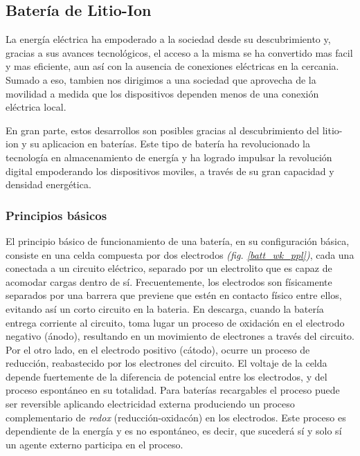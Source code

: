 \documentclass[10pt,a4paper]{article}
\begin{document}
\subsection{Batería de Litio-Ion}

La energía eléctrica ha empoderado a la sociedad desde su descubrimiento y,
gracias a sus avances tecnológicos, el acceso a la misma se ha convertido mas
facil y mas eficiente, aun así con la ausencia de conexiones eléctricas en la
cercania. Sumado a eso, tambien nos dirigimos a una sociedad que aprovecha de la
movilidad a medida que los dispositivos dependen menos de una conexi\'on 
el\'ectrica local.

\noindent En gran parte, estos desarrollos son posibles gracias al
descubrimiento del litio-ion y su aplicacion en baterías. Este tipo de batería
ha revolucionado la tecnolog\'ia en almacenamiento de energ\'ia y ha logrado
impulsar la revoluci\'on digital empoderando los dispositivos moviles, 
a trav\'es de su gran capacidad y densidad energ\'etica.

\subsubsection{Principios b\'asicos}

El principio básico de funcionamiento de una batería, en su configuraci\'on
b\'asica, consiste en una celda compuesta por dos electrodos 
\emph{(fig. \ref{batt_wk_ppl})}, cada una conectada a un circuito el\'ectrico, 
separado por un electrolito que es capaz de acomodar cargas dentro de sí. 
Frecuentemente, los electrodos son f\'isicamente separados por una barrera que 
previene que estén en contacto físico entre ellos, evitando así un corto 
circuito en la bateria. En descarga, cuando la bater\'ia entrega corriente al 
circuito, toma lugar un proceso de oxidación en el electrodo negativo (\'anodo), 
resultando en un movimiento de electrones a trav\'es del circuito. Por el otro 
lado, en el electrodo positivo (c\'atodo), ocurre un proceso de reducción, 
reabastecido por los electrones del circuito. El voltaje de la celda depende 
fuertemente de la diferencia de potencial entre los electrodos, y del proceso 
espont\'aneo en su totalidad. Para baterías recargables el proceso puede ser 
reversible aplicando electricidad externa produciendo un proceso complementario 
de \emph{redox} (reducci\'on-oxidac\'on) en los electrodos. Este proceso es 
dependiente de la energ\'ia y es no espont\'aneo, es decir, que sucederá s\'i y 
solo s\'i un agente externo participa en el proceso.
\end{document}
